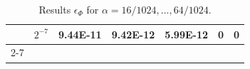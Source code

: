 \begin{table}[]
\begin{tabular}{lllllll}
\multicolumn{1}{l|}{}           & \multicolumn{1}{l|}{$2^{-7}$} & \multicolumn{1}{l|}{9.44E-11}                         & \multicolumn{1}{l|}{9.42E-12}                         & \multicolumn{1}{l|}{5.99E-12}                         & \multicolumn{1}{l|}{0}                                & \multicolumn{1}{l|}{0}                                \\ \cline{2-7} 
\end{tabular}
\caption{Results $\epsilon_{\Phi}$ for $\alpha=16/1024,...,64/1024$.}
\label{tbl:accuracy}
\end{table}


